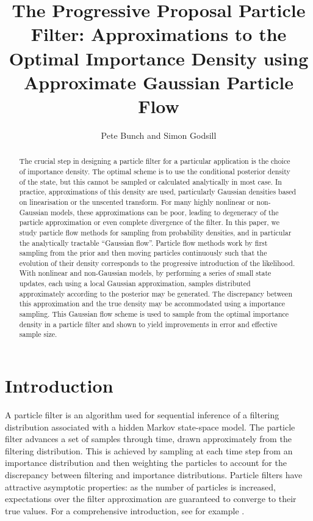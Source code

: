 \documentclass{article}
\title{The Progressive Proposal Particle Filter: Approximations to the Optimal Importance Density using Approximate Gaussian Particle Flow}
\author{Pete Bunch and Simon Godsill}
\date{}
\begin{document}
\maketitle

\begin{abstract}
The crucial step in designing a particle filter for a particular application is the choice of importance density. The optimal scheme is to use the conditional posterior density of the state, but this cannot be sampled or calculated analytically in most case. In practice, approximations of this density are used, particularly Gaussian densities based on linearisation or the unscented transform. For many highly nonlinear or non-Gaussian models, these approximations can be poor, leading to degeneracy of the particle approximation or even complete divergence of the filter. In this paper, we study particle flow methods for sampling from probability densities, and in particular the analytically tractable ``Gaussian flow''. Particle flow methods work by first sampling from the prior and then moving particles continuously such that the evolution of their density corresponds to the progressive introduction of the likelihood. With nonlinear and non-Gaussian models, by performing a series of small state updates, each using a local Gaussian approximation, samples distributed approximately according to the posterior may be generated. The discrepancy between this approximation and the true density may be accommodated using a importance sampling. This Gaussian flow scheme is used to sample from the optimal importance density in a particle filter and shown to yield improvements in error and effective sample size.
\end{abstract}






\section{Introduction}

A particle filter is an algorithm used for sequential inference of a filtering distribution associated with a hidden Markov state-space model. The particle filter advances a set of samples through time, drawn approximately from the filtering distribution. This is achieved by sampling at each time step from an importance distribution and then weighting the particles to account for the discrepancy between filtering and importance distributions. Particle filters have attractive asymptotic properties: as the number of particles is increased, expectations over the filter approximation are guaranteed to converge to their true values. For a comprehensive introduction, see for example \citep{Cappe2007,Doucet2009}.
\end{document}
